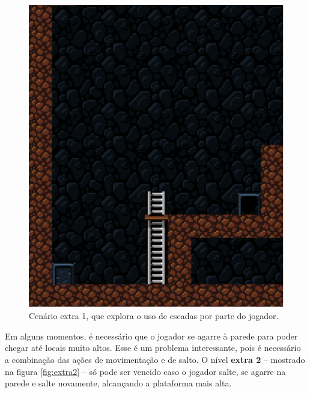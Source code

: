 \begin{figure}[H]
\centering
\includegraphics[width=\textwidth / 2]{fig/levels/extra1.pdf}
\caption{Cenário extra 1, que explora o uso de escadas por parte do jogador.}
\label{fig:extra1}
\end{figure}

Em alguns momentos, é necessário que o jogador se agarre à parede para poder
chegar até locais muito altos. Esse é um problema interessante, pois é
necessário a combinação das ações de movimentação e de salto. O nível
\textbf{extra 2} -- mostrado na figura \ref{fig:extra2} -- só pode ser vencido
caso o jogador salte, se agarre na parede e salte novamente, alcançando a
plataforma mais alta.


